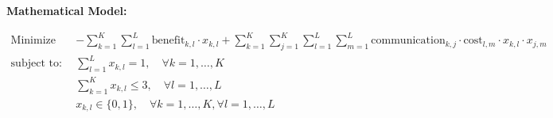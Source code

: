 \documentclass{article}
\begin{document}
\textbf{Mathematical Model:}

\begin{align*}
\text{Minimize} \quad & - \sum_{k=1}^{K} \sum_{l=1}^{L} \text{benefit}_{k,l} \cdot x_{k,l} + \sum_{k=1}^{K} \sum_{j=1}^{K} \sum_{l=1}^{L} \sum_{m=1}^{L} \text{communication}_{k,j} \cdot \text{cost}_{l,m} \cdot x_{k,l} \cdot x_{j,m} \\
\text{subject to:} \quad & \sum_{l=1}^{L} x_{k,l} = 1, \quad \forall k = 1, \ldots, K \\
& \sum_{k=1}^{K} x_{k,l} \leq 3, \quad \forall l = 1, \ldots, L \\
& x_{k,l} \in \{0, 1\}, \quad \forall k = 1, \ldots, K, \forall l = 1, \ldots, L
\end{align*}
\end{document}
